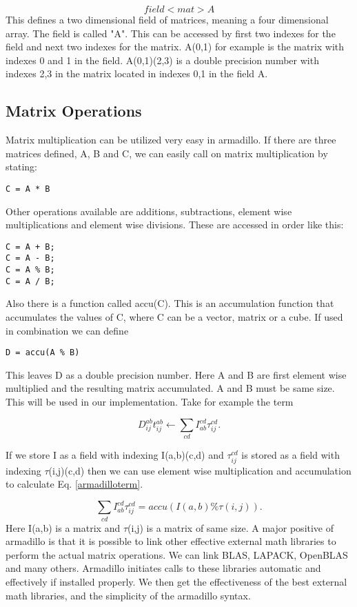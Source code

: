 \begin{equation}
field<mat> A \nonumber
\end{equation}
This defines a two dimensional field of matrices, meaning a four dimensional array. The field is called "A". This can be accessed by first two indexes for the field and next two indexes for the matrix. A(0,1) for example is the matrix with indexes 0 and 1 in the field. A(0,1)(2,3) is a double precision number with indexes 2,3 in the matrix located in indexes 0,1 in the field A.

\subsection{Matrix Operations}
Matrix multiplication can be utilized very easy in armadillo. If there are three matrices defined, A, B and C, we can easily call on matrix multiplication by stating:

\begin{lstlisting}
C = A * B 
\end{lstlisting}
Other operations available are additions, subtractions, element wise multiplications and element wise divisions. These are accessed in order like this:

\begin{lstlisting}
C = A + B;
C = A - B;
C = A % B;
C = A / B;
\end{lstlisting}
Also there is a function called accu(C). This is an accumulation function that accumulates the values of C, where C can be a vector, matrix or a cube. If used in combination we can define

\begin{lstlisting}
D = accu(A % B)
\end{lstlisting}
This leaves D as a double precision number. Here A and B are first element wise multiplied and the resulting matrix accumulated. A and B must be same size. This will be used in our implementation. Take for example the term

\begin{equation}
D_{ij}^{ab} t_{ij}^{ab} \leftarrow \sum_{cd} I_{ab}^{cd} \tau_{ij}^{cd} . \label{armadilloterm}
\end{equation}

If we store I as a field with indexing I(a,b)(c,d) and $\tau_{ij}^{cd}$ is stored as a field with indexing $\tau$(i,j)(c,d) then we can use element wise multiplication and accumulation to calculate Eq. \eqref{armadilloterm}.

\begin{equation}
\sum_{cd} I_{ab}^{cd} \tau_{ij}^{cd}
= accu(I(a,b) \% \tau(i,j)) .
\end{equation}
Here I(a,b) is a matrix and $\tau$(i,j) is a matrix of same size. A major positive of armadillo is that it is possible to link other effective external math libraries to perform the actual matrix operations. We can link BLAS, LAPACK, OpenBLAS and many others. Armadillo initiates calls to these libraries automatic and effectively if installed properly. We then get the effectiveness of the best external math libraries, and the simplicity of the armadillo syntax.

